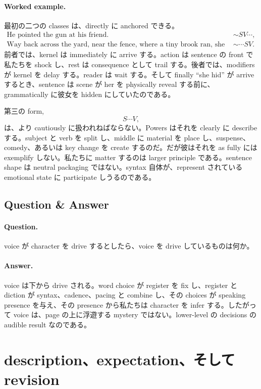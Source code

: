 \paragraph{Worked example.} 最初の二つの classes は、directly に anchored できる。
\begin{align}
\text{He pointed the gun at his friend.} &\sim SV\cdots,\\
\text{Way back across the yard, near the fence, where a tiny brook ran, she hid.} &\sim \cdots SV.
\end{align}
前者では、kernel は immediately に arrive する。action は sentence の front で私たちを shock し、rest は consequence として trail する。後者では、modifiers が kernel を delay する。reader は wait する。そして finally ``she hid'' が arrive するとき、sentence は scene が her を physically reveal する前に、grammatically に彼女を hidden にしていたのである。

第三の form,
\[
S\cdots V,
\]
は、より cautiously に扱われねばならない。Powers はそれを clearly に describe する。subject と verb を split し、middle に material を place し、suspense、comedy、あるいは key change を create するのだ。だが彼はそれを as fully には exemplify しない。私たちに matter するのは larger principle である。sentence shape は neutral packaging ではない。syntax 自体が、represent されている emotional state に participate しうるのである。

\subsection{Question \& Answer}

\paragraph{Question.} voice が character を drive するとしたら、voice を drive しているものは何か。

\paragraph{Answer.} voice は下から drive される。word choice が register を fix し、register と diction が syntax、cadence、pacing と combine し、その choices が speaking presence を与え、その presence から私たちは character を infer する。したがって voice は、page の上に浮遊する mystery ではない。lower-level の decisions の audible result なのである。

\section{description、expectation、そして revision}

